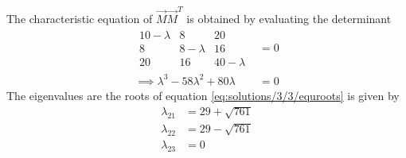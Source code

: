 The characteristic equation of $\vec{M}\vec{M}^T$ is obtained by evaluating the determinant 
\begin{align}
   \begin{array}{|ccc|}
10-\lambda & 8 & 20 \\ 8 & 8-\lambda & 16\\20 & 16 & 40-\lambda
\end{array}&=0\\
\implies \lambda^3-58\lambda^2+80\lambda&=0\label{eq:solutions/3/3/equroots}
\end{align}
The eigenvalues are the roots of equation \ref{eq:solutions/3/3/equroots} is given by 
\begin{align}
    \lambda_{21}&=29+\sqrt{761}
\\
    \lambda_{22}&=29-\sqrt{761}
\\
    \lambda_{23}&=0
\end{align}

